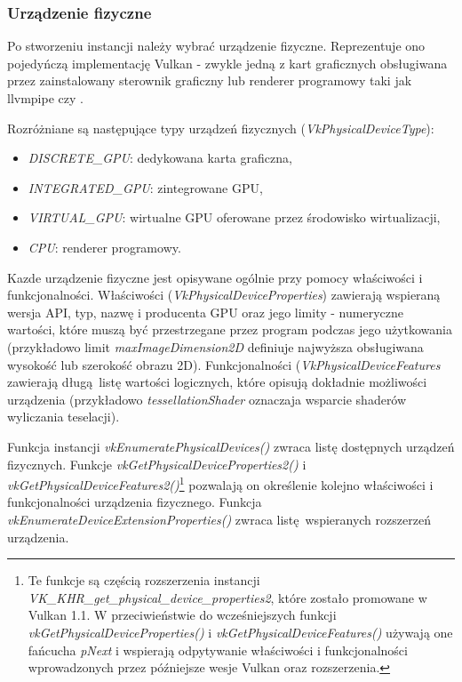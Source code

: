 \subsubsection{Urządzenie fizyczne}

Po stworzeniu instancji należy wybrać urządzenie fizyczne. Reprezentuje ono pojedyńczą implementację Vulkan - zwykle jedną z kart graficznych obsługiwana przez zainstalowany sterownik graficzny lub renderer programowy taki jak llvmpipe \cite{LLVMPIPE} czy \cite{SWIFTSHADER}.

Rozróżniane są następujące typy urządzeń fizycznych (\textit{VkPhysicalDeviceType}):
\begin{itemize}
	\item \textit{DISCRETE\_GPU}: dedykowana karta graficzna,
	\item \textit{INTEGRATED\_GPU}: zintegrowane GPU,
	\item \textit{VIRTUAL\_GPU}: wirtualne GPU oferowane przez środowisko wirtualizacji,
	\item \textit{CPU}: renderer programowy.
\end{itemize}

Kazde urządzenie fizyczne jest opisywane ogólnie przy pomocy właściwości i funkcjonalności.
Właściwości (\textit{VkPhysicalDeviceProperties}) zawierają wspieraną wersja API, typ, nazwę i producenta GPU oraz jego limity - numeryczne wartości, które muszą być przestrzegane przez program podczas jego użytkowania (przykładowo limit \textit{maxImageDimension2D} definiuje najwyższa obsługiwana wysokość lub szerokość obrazu 2D).
Funkcjonalności (\textit{VkPhysicalDeviceFeatures} zawierają długą listę wartości logicznych, które opisują dokładnie możliwości urządzenia (przykładowo \textit{tessellationShader} oznaczaja wsparcie shaderów wyliczania teselacji).

Funkcja instancji \textit{vkEnumeratePhysicalDevices()} zwraca listę dostępnych urządzeń fizycznych.
Funkcje \textit{vkGetPhysicalDeviceProperties2()} i \textit{vkGetPhysicalDeviceFeatures2()}\footnote{Te funkcje są częścią rozszerzenia instancji \textit{VK\_KHR\_get\_physical\_device\_properties2}, które zostało promowane w Vulkan 1.1. W przeciwieństwie do wcześniejszych funkcji \textit{vkGetPhysicalDeviceProperties()} i \textit{vkGetPhysicalDeviceFeatures()} używają one fańcucha \textit{pNext} i wspierają odpytywanie właściwości i funkcjonalności wprowadzonych przez późniejsze wesje Vulkan oraz rozszerzenia.} pozwalają on określenie kolejno właściwości i funkcjonalności urządzenia fizycznego.
Funkcja \textit{vkEnumerateDeviceExtensionProperties()} zwraca listę wspieranych rozszerzeń urządzenia.

